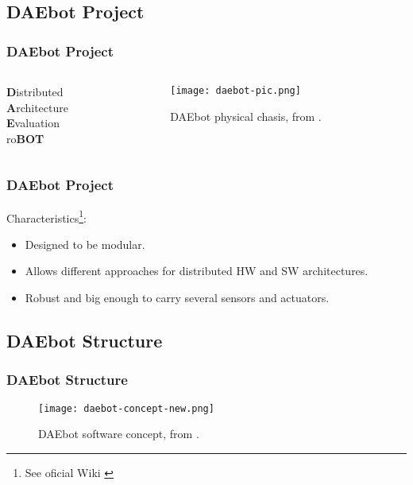 
\subsection{DAEbot Project}

\begin{frame}
	\frametitle{DAEbot Project}
	\begin{columns}
		\begin{column}{0.4\textwidth}
			\begin{flushleft}
				\LARGE
				\textbf{D}istributed \\
				\textbf{A}rchitecture \\
				\textbf{E}valuation \\
				ro\textbf{BOT}
			\end{flushleft}
		\end{column} \pause
		\begin{column}{0.6\textwidth}
			\begin{figure}
				\texttt{[image: daebot-pic.png]}
				\caption{DAEbot physical chasis, from \cite{Wiki}.}\label{fig:daebot-pic}
			\end{figure}
		\end{column}
	\end{columns}
\end{frame}

\begin{frame}
	\frametitle{DAEbot Project}
	Characteristics\footnote[frame]{See oficial Wiki \cite{Wiki}}:
	\begin{itemize}
		\item Designed to be modular. \pause
		\item Allows different approaches for distributed HW and SW architectures. \pause
		\item Robust and big enough to carry several sensors and actuators.
	\end{itemize}
\end{frame}

\subsection{DAEbot Structure}

\begin{frame}
	\frametitle{DAEbot Structure}
	\begin{figure}
		\texttt{[image: daebot-concept-new.png]}
		\caption{DAEbot software concept, from \cite{Wiki}.}\label{fig:daebot-concept-new}
	\end{figure}
\end{frame}

